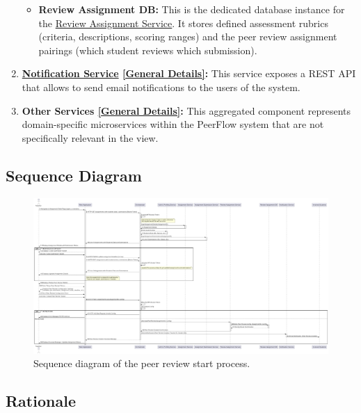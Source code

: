 \begin{enumerate}
\begin{itemize}
         \item \textbf{Review Assignment DB:} This is the dedicated database instance for the \hyperref[def:ReviewAssignmentService]{Review Assignment Service}. It stores defined assessment rubrics (criteria, descriptions, scoring ranges) and the peer review assignment pairings (which student reviews which submission).
    \end{itemize}
   
    \item \textbf{\hyperref[def:NotificationService]{Notification Service} \hyperref[def:GenDetailsNotification]{[General Details]}:} This service exposes a REST API that allows to send email notifications to the users of the system.
    
    \item \textbf{Other Services \hyperref[def:GenDetailsOtherServices]{[General Details]}:} This aggregated component represents domain-specific microservices within the PeerFlow system that are not specifically relevant in the view.
\end{enumerate}

\clearpage
\subsection{Sequence Diagram}

\begin{figure}[h]
    \centering
    \includegraphics[width=0.9\linewidth]{Architettura/imgs/pr_start_seq.pdf}
    \caption{Sequence diagram of the peer review start process.}
    \label{fig:seqPeerReviewStart}
\end{figure}

\subsection{Rationale}

